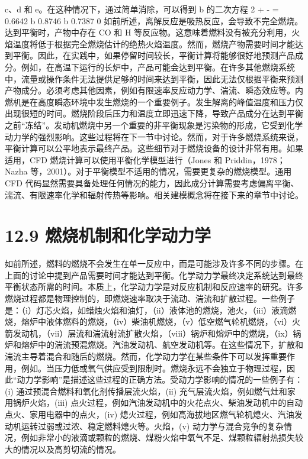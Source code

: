 \documentclass[11pt,a4paper,openany,fontset=none]{ctexbook}
\begin{document}
c、d 和 e。在这种情况下，通过简单消除，可以得到 b 的二次方程 2 + - = 0.6642 b 0.8746 b 0.7387 0
如前所述，离解反应是吸热反应，会导致不完全燃烧。达到平衡时，产物中存在 CO 和 H 等反应物。这意味着燃料没有被充分利用，火焰温度将低于根据完全燃烧估计的绝热火焰温度。然而，燃烧产物需要时间才能达到平衡。因此，在实践中，如果停留时间较长，平衡计算将能够很好地预测产品成分。例如，在高温下运行的长炉中，产品可能会达到平衡。在许多其他燃烧系统中，流量或操作条件无法提供足够的时间来达到平衡，因此无法仅根据平衡来预测产物成分。必须考虑其他因素，例如有限速率反应动力学、湍流、瞬态效应等。内燃机是在高度瞬态环境中发生燃烧的一个重要例子。发生解离的峰值温度和压力仅出现很短的时间。燃烧阶段后压力和温度立即迅速下降，导致产品成分在达到平衡之前“冻结”。发动机燃烧中另一个重要的非平衡现象是污染物的形成，它受到化学动力学的强烈影响。这些过程将在下一节中讨论。然而，对于许多燃烧系统来说，平衡计算可以公平地表示最终产品。这些细节对于燃烧设备的设计非常有用。如果适用，CFD
燃烧计算可以使用平衡化学模型进行（Jones 和 Priddin，1978；Nazha 等，2001）。对于平衡模型不适用的情况，需要更复杂的燃烧模型。通用 CFD 代码显然需要具备处理任何情况的能力，因此成分计算需要考虑偏离平衡、湍流、有限速率化学和辐射传热等影响。相关建模概念将在接下来的章节中讨论。

\section*{12.9 燃烧机制和化学动力学}

如前所述，燃料的燃烧不会发生在单一反应中，而是可能涉及许多不同的步骤。在上面的讨论中提到产品需要时间才能达到平衡。化学动力学最终决定系统达到最终平衡状态所需的时间。本质上，化学动力学是对反应机制和反应速率的研究。许多燃烧过程都是物理控制的，即燃烧速率取决于流动、湍流和扩散过程。一些例子是：（i）灯芯火焰，如蜡烛火焰和油灯，（ii）液体池的燃烧，池火，（iii）液滴燃烧，熔炉中液体燃料的燃烧，（iv）柴油机燃烧，（v）低空燃气轮机燃烧，（vi）火箭发动机，（vii）层流和湍流射流扩散火焰，（viii）锅炉和熔炉中的燃烧，（ix）锅炉和熔炉中的湍流预混燃烧。汽油发动机、航空发动机等。在这些情况下，扩散和湍流主导着混合和随后的燃烧。然而，化学动力学在某些条件下可以发挥重要作用，例如。当压力低或氧气供应受到限制时。燃烧永远不会独立于物理过程，因此“动力学影响”是描述这些过程的正确方法。受动力学影响的情况的一些例子有：(i) 通过预混合燃料和氧化剂传播层流火焰，(ii) 充气层流火焰，例如燃气灶和家用锅炉火焰，(iii) 点火过程，例如汽油发动机中的火花点火、柴油发动机中的自动点火、家用电器中的点火，(iv) 熄火过程，例如高海拔地区燃气轮机熄火、汽油发动机运转过弱或过浓、稳定燃料熄火等。火焰，(v) 动力学与混合竞争的复杂情况，例如非常小的液滴或颗粒的燃烧、煤粉火焰中氧气不足、煤颗粒辐射热损失较大的情况以及高剪切流的情况。
\end{document}
